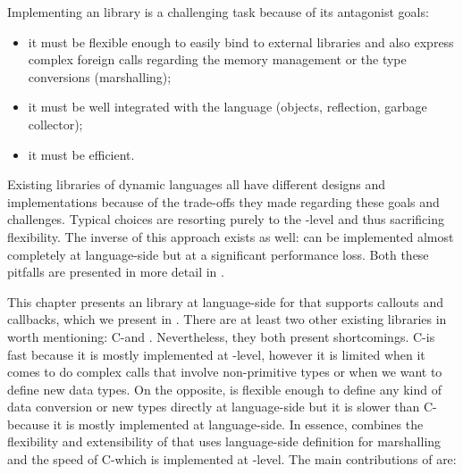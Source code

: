 Implementing an \FFI library is a challenging task because of its antagonist goals:
\begin{itemize}
    \item it must be flexible enough to easily bind to external libraries and also express complex foreign calls regarding the memory management or the type conversions (marshalling);
    \item it must be well integrated with the language (objects, reflection, garbage collector);
    \item it must be efficient.
\end{itemize}
%
Existing \FFI libraries of dynamic languages all have different designs and implementations because of the trade-offs they made regarding these goals and challenges.
Typical choices are resorting purely to the \VM-level and thus sacrificing flexibility.
The inverse of this approach exists as well: \FFIs can be implemented almost completely at language-side but at a significant performance loss.
Both these pitfalls are presented in more detail in .

This chapter presents  an \FFI library at language-side for \PH that supports callouts and callbacks, which we present in .
There are at least two other existing \FFI libraries in \PH worth mentioning: C-\FFI and \Alien.
Nevertheless, they both present shortcomings.
C-\FFI is fast because it is mostly implemented at \VM-level, however it is limited when it comes to do complex calls that involve non-primitive types or when we want to define new data types.
On the opposite, \Alien \FFI is flexible enough to define any kind of data conversion or new types directly at language-side but it is slower than C-\FFI because it is mostly implemented at language-side.
In essence, \NBFFI combines the flexibility and extensibility of \Alien that uses language-side definition for marshalling and the speed of C-\FFI which is implemented at \VM-level.
The main contributions of \NBFFI are:


